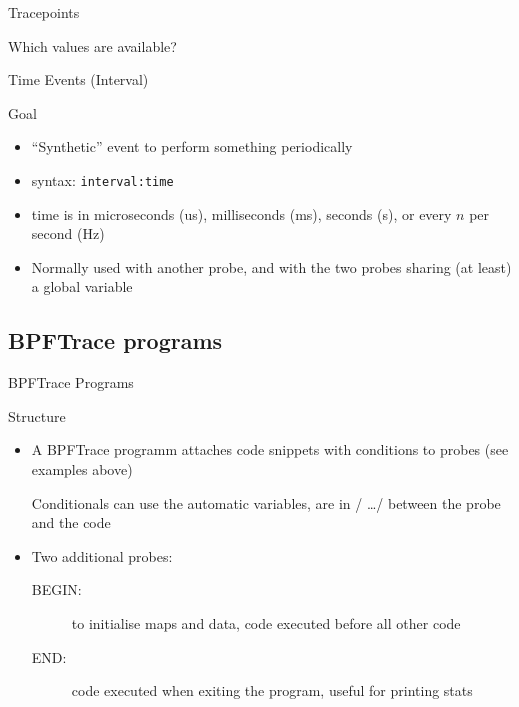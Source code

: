 \begin{reveals}
\begin{frame}[c,fragile]{Tracepoints}
\begin{block}{Which values are available?}
  \end{block}

\end{frame}


\begin{frame}[c,fragile]{Time Events (Interval)}
  
  \begin{block}{Goal}
    \begin{itemize}
    \item ``Synthetic'' event to perform something periodically
    \item syntax: \texttt{interval:time}
    \item time is in microseconds (us), milliseconds (ms), seconds
      (s), or every \(n\) per second (Hz)
    \item Normally used with another probe, and with the two probes
      sharing (at least) a global variable
    \end{itemize}
  \end{block}

\end{frame}


\subsection{BPFTrace programs}



\begin{frame}[c,fragile]{BPFTrace Programs}
  
  \begin{block}{Structure}
    \begin{itemize}
    \item A BPFTrace programm attaches code snippets with conditions
      to probes (see examples above)
      \begin{center}
        Conditionals can use the automatic variables, are in / \ldots /
        between the probe and the code
      \end{center}
    \item Two additional probes:
      \begin{description}
      \item[BEGIN:] to initialise maps and data, code executed before
        all other code
      \item[END:] code executed when exiting the program, useful for
        printing stats
      \end{description}
    \end{itemize}
  \end{block}


\end{frame}
\end{reveals}
